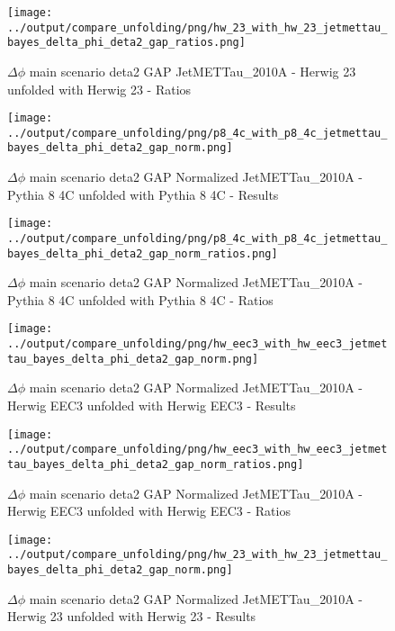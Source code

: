 \documentclass[11pt]{book}
\begin{document}
\begin{figure}[ht]
\centering
\texttt{[image: ../output/compare\_unfolding/png/hw\_23\_with\_hw\_23\_jetmettau\_bayes\_delta\_phi\_deta2\_gap\_ratios.png]}
\caption{$\Delta\phi$ main scenario deta2 GAP JetMETTau\_2010A - Herwig 23 unfolded with Herwig 23 - Ratios}
\label{hw_23_hw_23_jetmettau_bayes_delta_phi_deta2_gap_b}
\end{figure}


\begin{figure}[ht]
\centering
\texttt{[image: ../output/compare\_unfolding/png/p8\_4c\_with\_p8\_4c\_jetmettau\_bayes\_delta\_phi\_deta2\_gap\_norm.png]}
\caption{$\Delta\phi$ main scenario deta2 GAP Normalized JetMETTau\_2010A - Pythia 8 4C unfolded with Pythia 8 4C - Results}
\label{p8_p8_jetmettau_bayes_delta_phi_deta2_gap_norm_a}
\end{figure}

\begin{figure}[ht]
\centering
\texttt{[image: ../output/compare\_unfolding/png/p8\_4c\_with\_p8\_4c\_jetmettau\_bayes\_delta\_phi\_deta2\_gap\_norm\_ratios.png]}
\caption{$\Delta\phi$ main scenario deta2 GAP Normalized JetMETTau\_2010A - Pythia 8 4C unfolded with Pythia 8 4C - Ratios}
\label{p8_p8_jetmettau_bayes_delta_phi_deta2_gap_norm_b}
\end{figure}

\begin{figure}[ht]
\centering
\texttt{[image: ../output/compare\_unfolding/png/hw\_eec3\_with\_hw\_eec3\_jetmettau\_bayes\_delta\_phi\_deta2\_gap\_norm.png]}
\caption{$\Delta\phi$ main scenario deta2 GAP Normalized JetMETTau\_2010A - Herwig EEC3 unfolded with Herwig EEC3 - Results}
\label{hw_eec3_hw_eec3_jetmettau_bayes_delta_phi_deta2_gap_norm_a}
\end{figure}

\begin{figure}[ht]
\centering
\texttt{[image: ../output/compare\_unfolding/png/hw\_eec3\_with\_hw\_eec3\_jetmettau\_bayes\_delta\_phi\_deta2\_gap\_norm\_ratios.png]}
\caption{$\Delta\phi$ main scenario deta2 GAP Normalized JetMETTau\_2010A - Herwig EEC3 unfolded with Herwig EEC3 - Ratios}
\label{hw_eec3_hw_eec3_jetmettau_bayes_delta_phi_deta2_gap_norm_b}
\end{figure}

\begin{figure}[ht]
\centering
\texttt{[image: ../output/compare\_unfolding/png/hw\_23\_with\_hw\_23\_jetmettau\_bayes\_delta\_phi\_deta2\_gap\_norm.png]}
\caption{$\Delta\phi$ main scenario deta2 GAP Normalized JetMETTau\_2010A - Herwig 23 unfolded with Herwig 23 - Results}
\label{hw_23_hw_23_jetmettau_bayes_delta_phi_deta2_gap_norm_a}
\end{figure}
\end{document}
